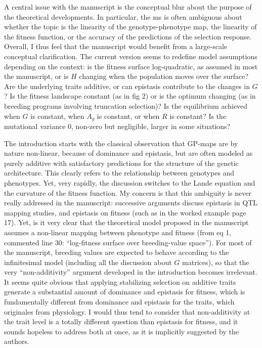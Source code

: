 \documentclass[11pt,a4paper]{article}
\begin{document}
\begin{revquote}
A central issue with the manuscript is the conceptual blur about the purpose of the theoretical developments. In particular, the ms is often ambiguous about whether the topic is the linearity of the genotype-phenotype map, the linearity of the fitness function, or the accuracy of the predictions of the selection response. Overall, I thus feel that the manuscript would benefit from a large-scale conceptual clarification. The current version seems to redefine model assumptions depending on the context: is the fitness surface log-quadratic, as assumed in most the manuscript, or is $H$ changing when the population moves over the surface? Are the underlying traits additive, or can epistasis contribute to the changes in $G$? Is the fitness landscape constant (as in fig 2) or is the optimum changing (as in breeding programs involving truncation selection)? Is the equilibrium achieved when $G$ is constant, when $A_g$ is constant, or when $R$ is constant? Is the mutational variance 0, non-zero but negligible, larger in some situations?

The introduction starts with the classical observation that GP-maps are by nature non-linear, because of dominance and epistasis, but are often modeled as purely additive with satisfactory predictions for the structure of the genetic architecture. This clearly refers to the relationship between genotypes and phenotypes. Yet, very rapidly, the discussion switches to the Lande equation and the curvature of the fitness function. My concern is that this ambiguity is never really addressed in the manuscript: successive arguments discuss epistasis in QTL mapping studies, and epistasis on fitness (such as in the worked example page 17). Yet, is it very clear that the theoretical model proposed in the manuscript assumes a non-linear mapping between phenotype and fitness (from eq 1, commented line 30: ``log-fitness surface over breeding-value space''). For most of the manuscript, breeding values are expected to behave according to the infinitesimal model (including all the discussion about $G$ matrices), so that the very ``non-additivity'' argument developed in the introduction becomes irrelevant. It seems quite obvious that applying stabilizing selection on additive traits generate a substantial amount of dominance and epistasis for fitness, which is fundamentally different from dominance and epistasis for the traits, which originales from physiology. I would thus tend to consider that non-additivity at the trait level is a totally different question than epistasis for fitness, and it sounds hopeless to address both at once, as it is implicitly suggested by the authors.


\end{revquote}
\end{document}
